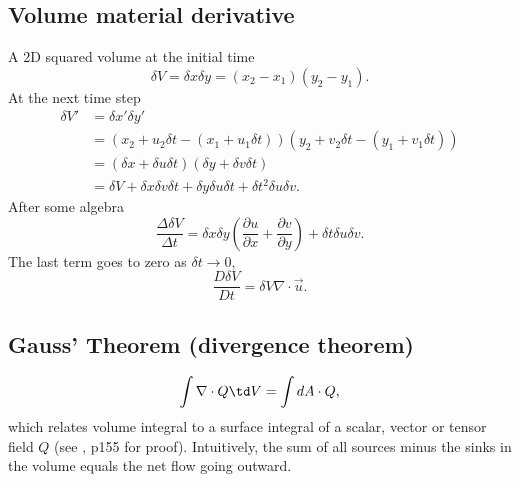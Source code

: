 \subsection{Volume material derivative} A 2D squared volume at the initial time \begin{equation}
\delta V = \delta x \delta y = (x_2-x_1)(y_2-y_1).  \end{equation} At the next time step
\begin{equation} \begin{aligned} \delta V' & = \delta x' \delta y'  \\ & = (x_2+u_2\delta t -
(x_1+u_1\delta t))(y_2+v_2\delta t - (y_1+v_1\delta t)) \\ & = (\delta x + \delta u \delta t)(\delta
y + \delta v \delta t) \\ & = \delta V + \delta x \delta v \delta t + \delta y \delta u \delta t +
\delta t^2 \delta u \delta v.  \end{aligned} \end{equation} After some algebra \begin{equation}
\frac{\Delta \delta V}{\Delta t} = \delta x \delta y (\frac{\partial u}{\partial x} + \frac{\partial
v}{\partial y}) + \delta t \delta u \delta v.  \end{equation} The last term goes to zero as $\delta
t \rightarrow 0$, \begin{equation} \label{eq:volume} \frac{D \delta V}{D t} = \delta V \nabla \cdot
\vec{u}.  \end{equation}

\subsection{Gauss' Theorem (divergence theorem)} \begin{defn*} \begin{equation} \int \nabla \cdot Q
\td V = \int dA \cdot Q, \end{equation} which relates volume integral to a surface integral of a
scalar, vector or tensor field $Q$ (see \cite{chapin2010vector}, p155 for proof). Intuitively, the
sum of all sources minus the sinks in the volume equals the net flow going outward.  \end{defn*}



